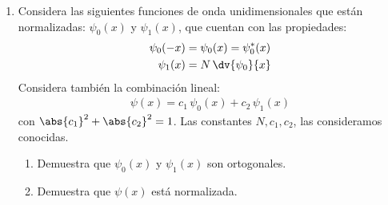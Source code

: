 \begin{enumerate}
\item Considera las siguientes funciones de onda unidimensionales que están normalizadas: $\psi_{0}(x)$ y $\psi_{1}(x)$, que cuentan con las propiedades:
\begin{align*}
\psi_{0}(-x) &= \psi_{0}(x) = \psi_{0}^{*} (x) \\
\psi_{1}(x) &= N \, \dv{\psi_{0}}{x}
\end{align*}
Considera también la combinación lineal:
\begin{align*}
\psi(x) = c_{1} \, \psi_{0}(x) + c_{2} \, \psi_{1} (x)
\end{align*}
con $\abs{c_{1}}^{2} + \abs{c_{2}}^{2} = 1$. Las constantes $N, c_{1}, c_{2}$, las consideramos conocidas.
\begin{enumerate}[label=\alph*)]
\item Demuestra que $\psi_{0}(x)$ y $\psi_{1}(x)$ son ortogonales.
\item Demuestra que $\psi(x)$ está normalizada.
\end{enumerate}
\end{enumerate}




